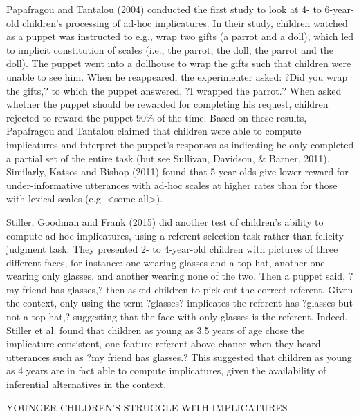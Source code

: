 Papafragou and Tantalou (2004) conducted the first study to look at 4- to 6-year-old children's processing of ad-hoc implicatures. In their study, children watched as a puppet was instructed to e.g., wrap two gifts (a parrot and a doll), which led to implicit constitution of scales (i.e., the parrot, the doll, the parrot and the doll). The puppet went into a dollhouse to wrap the gifts such that children were unable to see him. When he reappeared, the experimenter asked: ?Did you wrap the gifts,? to which the puppet answered, ?I wrapped the parrot.? When asked whether the puppet should be rewarded for completing his request, children rejected to reward the puppet 90\% of the time. Based on these results, Papafragou and Tantalou claimed that children were able to compute implicatures and interpret the puppet's responses as indicating he only completed a partial set of the entire task (but see Sullivan, Davidson, & Barner, 2011). Similarly, Katsos and Bishop (2011) found that 5-year-olds give lower reward for under-informative utterances with ad-hoc scales at higher rates than for those with lexical scales (e.g. <some-all>).

Stiller, Goodman and Frank (2015) did another test of children's ability to compute ad-hoc implicatures, using a referent-selection task rather than felicity-judgment task. They presented 2- to 4-year-old children with pictures of three different faces, for instance: one wearing glasses and a top hat, another one wearing only glasses, and another wearing none of the two. Then a puppet said, ?my friend has glasses,? then asked children to pick out the correct referent. Given the context, only using the term ?glasses? implicates the referent has ?glasses but not a top-hat,? suggesting that the face with only glasses is the referent. Indeed, Stiller et al. found that children as young as 3.5 years of age chose the implicature-consistent, one-feature referent above chance when they heard utterances such as ?my friend has glasses.? This suggested that children as young as 4 years are in fact able to compute implicatures, given the availability of inferential alternatives in the context. 

YOUNGER CHILDREN'S STRUGGLE WITH IMPLICATURES

